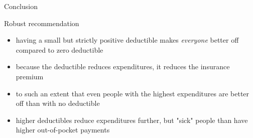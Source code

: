 \documentclass[presentation]{beamer}
\begin{document}
\begin{frame}[label={sec:org22618ff}]{Conclusion}
\begin{block}{Robust recommendation}
\begin{itemize}
\item having a small but strictly positive deductible makes \emph{everyone} better off compared to zero deductible
\item because the deductible reduces expenditures, it reduces the insurance premium
\item to such an extent that even people with the highest expenditures are better off than with no deductible
\item higher deductibles reduce expenditures further, but "sick" people than have higher out-of-pocket payments
\end{itemize}
\end{block}
\end{frame}
\end{document}
